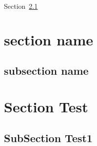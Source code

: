 \documentclass[10pt,a4paper,extrafontsizes]{memoir}
\begin{document}



Section~\ref{sub:subsec1}

\section{section name} %
\label{sec:section_name}



\subsection{subsection name} %
\label{sub:subsection_name}


\section{Section Test}

\subsection{SubSection Test1}
\label{sub:subsec1}
\end{document}
